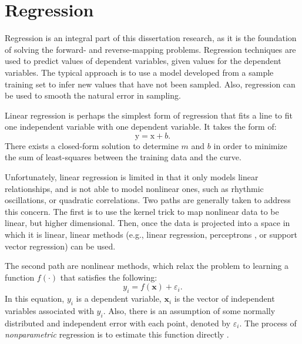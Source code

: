 

\section{Regression}
Regression is an integral part of this dissertation research, as it is the foundation of solving the forward- and reverse-mapping problems.
Regression techniques are used to predict values of dependent variables, given values for the dependent variables.
The typical approach is to use a model developed from a sample training set to infer new values that have not been sampled.
Also, regression can be used to smooth the natural error in sampling.

Linear regression is perhaps the simplest form of regression that fits a line to fit one independent variable with one dependent variable. It takes the form of:
\[\mathrm{y} = \mathrm{x} + b.\]
There exists a closed-form solution to determine $m$ and $b$ in order to minimize the sum of least-squares between the training data and the curve.

Unfortunately, linear regression is limited in that it only models linear relationships, and is not able to model nonlinear ones, such as rhythmic oscillations, or quadratic correlations.
Two paths are generally taken to address this concern.
The first is to use the kernel trick \cite{muller2001introduction} to map nonlinear data to be linear, but higher dimensional.
Then, once the data is projected into a space in which it is linear, linear methods (e.g., linear regression, perceptrons \cite{minsky19882perceptrons}, or support vector regression\cite{smola2004tsv}) can be used.

The second path are nonlinear methods, which relax the problem to learning a function $f(\cdot)$ that satisfies the following:
\[y_i = f(\mathbf x) + \varepsilon_i.\]
In this equation, $y_i$ is a dependent variable, $\mathbf x_i$ is the vector of independent variables associated with $y_i$.
Also, there is an assumption of some normally distributed and independent error with each point, denoted by $\varepsilon_i$.
The process of \textit{nonparametric} regression is to estimate this function directly \cite{fox2002r}.

